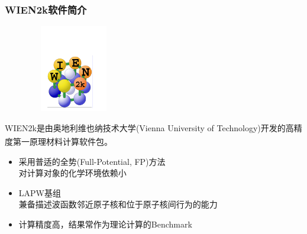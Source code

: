 \documentclass[cjk,slidestop,compress,mathserif,blue]{beamer}
\newcommand{\upcite}[1]{\hspace{0ex}\textsuperscript{\cite{#1}}} %
\begin{document}
\small
\frame
{
\frametitle{\textrm{WIEN2k}软件简介}
\begin{figure}[h!]
\centering
\vspace*{-0.2in}
\includegraphics[height=1.5in,width=1.6in,viewport=13 35 475 515,clip]{Figures/logo_WIEN2k.pdf}
\label{Logo_of_WIEN2k}
\end{figure}
\textrm{WIEN2k}是由奥地利维也纳技术大学\textrm{(Vienna University of Technology)}开发的高精度第一原理材料计算软件包\upcite{WIEN2k_UG}。%
\begin{itemize}
	\item 采用普适的全势\textrm{(Full-Potential, FP)}方法\\对计算对象的化学环境依赖小
	\item \textrm{LAPW}基组\\兼备描述波函数邻近原子核和位于原子核间行为的能力
	\item 计算精度高，结果常作为理论计算的\textrm{Benchmark}
\end{itemize}
}
\end{document}
